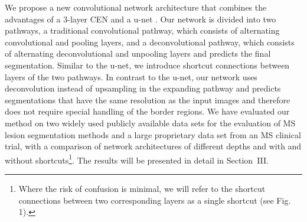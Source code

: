 % 



We propose a new convolutional network architecture that combines the advantages
of a 3-layer CEN \cite{brosch2015} and a u-net \cite{ronneberger2015}. Our
network is divided into two pathways, a traditional convolutional pathway, which
consists of alternating convolutional and pooling layers, and a deconvolutional
pathway, which consists of alternating deconvolutional and unpooling layers and
predicts the final segmentation. Similar to the u-net, we introduce shortcut
connections between layers of the two pathways. In contrast to the u-net, our
network uses deconvolution instead of upsampling in the expanding pathway and
predicts segmentations that have the same resolution as the input images and
therefore does not require special handling of the border regions. We have
evaluated our method on two widely used publicly available data sets for the
evaluation of MS lesion segmentation methods and a large proprietary data set
from an MS clinical trial, with a comparison of network architectures of
different depths and with and without shortcuts\footnote{Where the risk of
confusion is minimal, we will refer to the shortcut connections between two
corresponding layers as a single shortcut (see Fig. 1).}. The results will be
presented in detail in Section~III.

